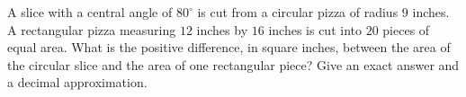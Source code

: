 A slice with a central angle of $80^\circ$ is cut from a circular pizza of radius $9$ inches. A rectangular pizza measuring $12$ inches by $16$ inches is cut into $20$ pieces of equal area. What is the positive difference, in square inches, between the area of the circular slice and the area of one rectangular piece? Give an exact answer and a decimal approximation.
